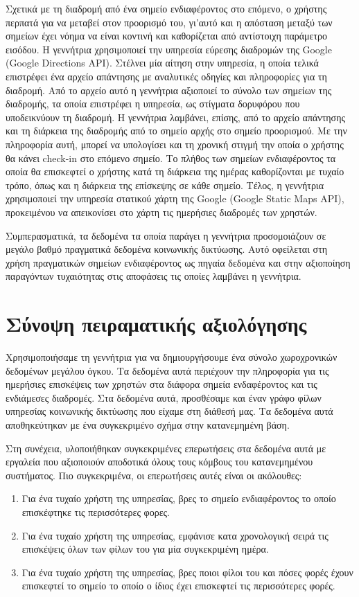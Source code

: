 Σχετικά με τη διαδρομή από ένα σημείο 
ενδιαφέροντος στο επόμενο, ο χρήστης περπατά για να μεταβεί στον προορισμό του, γι'αυτό και η απόσταση μεταξύ των σημείων έχει νόημα να είναι κοντινή και 
καθορίζεται από αντίστοιχη παράμετρο εισόδου. Η γεννήτρια χρησιμοποιεί την υπηρεσία εύρεσης διαδρομών της Google (Google Directions API). 
Στέλνει μία αίτηση στην υπηρεσία, 
η οποία τελικά επιστρέφει ένα αρχείο απάντησης με αναλυτικές οδηγίες και πληροφορίες για τη διαδρομή. Από το αρχείο αυτό η γεννήτρια αξιοποιεί το σύνολο των σημείων της 
διαδρομής, τα οποία επιστρέφει η υπηρεσία, ως στίγματα δορυφόρου που υποδεικνύουν τη διαδρομή. Η γεννήτρια λαμβάνει, επίσης, από το αρχείο απάντησης και τη διάρκεια 
της διαδρομής από το σημείο αρχής στο σημείο προορισμού. Με την πληροφορία αυτή, μπορεί να υπολογίσει και τη χρονική στιγμή την οποία ο χρήστης θα κάνει check-in στο 
επόμενο σημείο. Το πλήθος των σημείων ενδιαφέροντος τα οποία θα επισκεφτεί ο χρήστης κατά τη διάρκεια της ημέρας καθορίζονται με τυχαίο τρόπο, όπως και 
η διάρκεια της επίσκεψης σε κάθε σημείο. Τέλος, η γεννήτρια χρησιμοποιεί την υπηρεσία στατικού χάρτη της Google (Google Static Maps API), προκειμένου να 
απεικονίσει στο χάρτη τις ημερήσιες διαδρομές των χρηστών. 

Συμπερασματικά, τα δεδομένα τα οποία παράγει η γεννήτρια προσομοιάζουν σε μεγάλο βαθμό πραγματικά δεδομένα κοινωνικής δικτύωσης. Αυτό οφείλεται 
στη χρήση πραγματικών σημείων ενδιαφέροντος ως πηγαία δεδομένα και στην αξιοποίηση παραγόντων τυχαιότητας στις αποφάσεις τις οποίες λαμβάνει η γεννήτρια. 


\section{Σύνοψη πειραματικής αξιολόγησης}

Χρησιμοποιήσαμε τη γεννήτρια για να δημιουργήσουμε ένα σύνολο χωροχρονικών δεδομένων μεγάλου όγκου. Τα δεδομένα αυτά περιέχουν την πληροφορία για τις 
ημερήσιες επισκέψεις των χρηστών στα διάφορα σημεία ενδαφέροντος και τις ενδιάμεσες διαδρομές. Στα δεδομένα αυτά, προσθέσαμε και έναν γράφο φίλων 
υπηρεσίας κοινωνικής δικτύωσης που είχαμε στη διάθεσή μας. Τα δεδομένα αυτά αποθηκεύτηκαν με ένα συγκεκριμένο σχήμα στην κατανεμημένη βάση. 

Στη συνέχεια, 
υλοποιήθηκαν συγκεκριμένες επερωτήσεις στα δεδομένα αυτά με εργαλεία που αξιοποιούν αποδοτικά όλους τους κόμβους του κατανεμημένου συστήματος. 
Πιο συγκεκριμένα, οι επερωτήσεις αυτές είναι οι ακόλουθες: 
\begin{enumerate}
 \item Για ένα τυχαίο χρήστη της υπηρεσίας, βρες το σημείο ενδιαφέροντος το οποίο επισκέφτηκε τις περισσότερες φορες.
 \item Για ένα τυχαίο χρήστη της υπηρεσίας, εμφάνισε κατα χρονολογική σειρά τις επισκέψεις όλων των φίλων του για μία συγκεκριμένη ημέρα.
 \item Για ένα τυχαίο χρήστη της υπηρεσίας, βρες ποιοι φίλοι του και πόσες φορές έχουν επισκεφτεί το σημείο το οποίο ο ίδιος έχει επισκεφτεί τις περισσότερες φορές. 
\end{enumerate}

